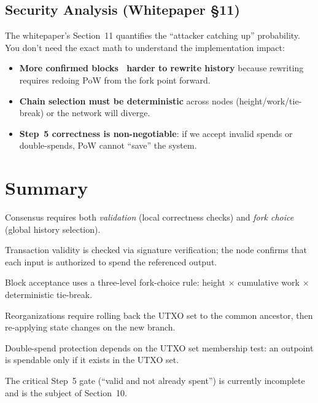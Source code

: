 \subsection{Security Analysis (Whitepaper \S11)}
\label{sec:ch09-7-security}

The whitepaper's Section~11 quantifies the ``attacker catching up'' probability. You don't need the exact math to understand the implementation impact:

\begin{itemize}
  \item \textbf{More confirmed blocks \textrightarrow\ harder to rewrite history} because rewriting requires redoing PoW from the fork point forward.
  \item \textbf{Chain selection must be deterministic} across nodes (height/work/tie-break) or the network will diverge.
  \item \textbf{Step~5 correctness is non-negotiable}: if we accept invalid spends or double-spends, PoW cannot ``save'' the system.
\end{itemize}

\section{Summary}
\label{sec:ch09-7-summary}

\begin{chaptersummary}
  \item Consensus requires both \emph{validation} (local correctness checks) and \emph{fork choice} (global history selection).
  \item Transaction validity is checked via signature verification; the node confirms that each input is authorized to spend the referenced output.
  \item Block acceptance uses a three-level fork-choice rule: height $\times$ cumulative work $\times$ deterministic tie-break.
  \item Reorganizations require rolling back the UTXO set to the common ancestor, then re-applying state changes on the new branch.
  \item Double-spend protection depends on the UTXO set membership test: an outpoint is spendable only if it exists in the UTXO set.
  \item The critical Step~5 gate (``valid and not already spent'') is currently incomplete and is the subject of Section~10.
\end{chaptersummary}
